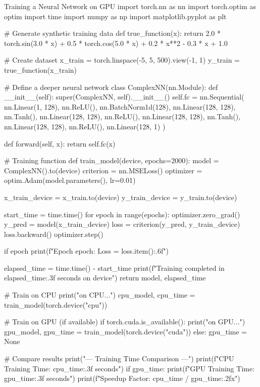 \begin{codeonly}{Training a Neural Network on GPU}
import torch.nn as nn
import torch.optim as optim
import time
import numpy as np
import matplotlib.pyplot as plt

# Generate synthetic training data
def true_function(x):
    return 2.0 * torch.sin(3.0 * x) + 0.5 * torch.cos(5.0 * x) + 0.2 * x**2 - 0.3 * x + 1.0

# Create dataset
x_train = torch.linspace(-5, 5, 500).view(-1, 1)
y_train = true_function(x_train)

# Define a deeper neural network
class ComplexNN(nn.Module):
    def __init__(self):
        super(ComplexNN, self).__init__()
        self.fc = nn.Sequential(
            nn.Linear(1, 128),
            nn.ReLU(),
            nn.BatchNorm1d(128),
            nn.Linear(128, 128),
            nn.Tanh(),
            nn.Linear(128, 128),
            nn.ReLU(),
            nn.Linear(128, 128),
            nn.Tanh(),
            nn.Linear(128, 128),
            nn.ReLU(),
            nn.Linear(128, 1)
        )
    
    def forward(self, x):
        return self.fc(x)

# Training function
def train_model(device, epochs=2000):
    model = ComplexNN().to(device)
    criterion = nn.MSELoss()
    optimizer = optim.Adam(model.parameters(), lr=0.01)
    
    x_train_device = x_train.to(device)
    y_train_device = y_train.to(device)
    
    start_time = time.time()
    for epoch in range(epochs):
        optimizer.zero_grad()
        y_pred = model(x_train_device)
        loss = criterion(y_pred, y_train_device)
        loss.backward()
        optimizer.step()
        
        if epoch %
            print(f"Epoch {epoch}: Loss = {loss.item():.6f}")
    
    elapsed_time = time.time() - start_time
    print(f"Training completed in {elapsed_time:.3f} seconds on {device}")
    return model, elapsed_time

# Train on CPU
print("\nTraining on CPU...")
cpu_model, cpu_time = train_model(torch.device("cpu"))

# Train on GPU (if available)
if torch.cuda.is_available():
    print("\nTraining on GPU...")
    gpu_model, gpu_time = train_model(torch.device("cuda"))
else:
    gpu_time = None

# Compare results
print("\n--- Training Time Comparison ---")
print(f"CPU Training Time: {cpu_time:.3f} seconds")
if gpu_time:
    print(f"GPU Training Time: {gpu_time:.3f} seconds")
    print(f"Speedup Factor: {cpu_time / gpu_time:.2f}x")
\end{codeonly}

